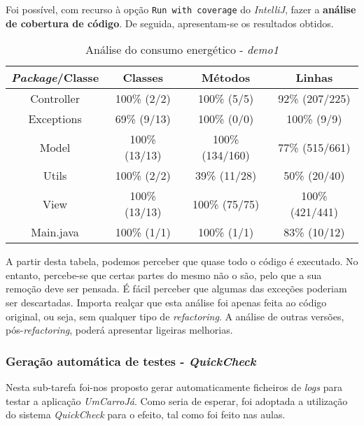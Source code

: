 \documentclass[a4paper]{report}
\begin{document}
Foi possível, com recurso à opção \texttt{Run with coverage} do \textit{IntelliJ}, fazer a \textbf{análise de cobertura de código}.
De seguida, apresentam-se os resultados obtidos.

\begin{table}[h] 
    \caption{Análise do consumo energético - \textit{demo1}}
    \begin{center}
        \begin{tabular}{ || c | c | c | c || }
        \hline
        \textbf{\textit{Package}/Classe} & \textbf{Classes} & \textbf{Métodos} & \textbf{Linhas} \\
        \hline
        \hline
        Controller & 100\% (2/2) & 100\% (5/5) & 92\% (207/225) \\
        \hline
        Exceptions & 69\% (9/13) & 100\% (0/0) & 100\% (9/9) \\
        \hline
        Model & 100\% (13/13) & 100\% (134/160) & 77\% (515/661) \\
        \hline
        Utils & 100\% (2/2) & 39\% (11/28) & 50\% (20/40) \\
        \hline
        View & 100\% (13/13) & 100\% (75/75) & 100\% (421/441) \\
        \hline
        Main.java & 100\% (1/1) & 100\% (1/1) & 83\% (10/12) \\
        \hline
        \end{tabular} 
    \end{center}
\end{table}

A partir desta tabela, podemos perceber que quase todo o código é executado. No entanto, percebe-se que certas partes do mesmo não o são, pelo que a sua remoção deve ser pensada.
É fácil perceber que algumas das exceções poderiam ser descartadas. Importa realçar que esta análise foi apenas feita ao código original, ou seja, sem qualquer tipo de \textit{refactoring}. 
A análise de outras versões, pós-\textit{refactoring}, poderá apresentar ligeiras melhorias.

\subsubsection{Geração automática de testes - \textit{QuickCheck}} \label{sssec:QuickCheckDemo1}
Nesta sub-tarefa foi-nos proposto gerar automaticamente ficheiros de \textit{logs} para testar a aplicação \textit{UmCarroJá}. Como seria de esperar, foi adoptada a utilização do sistema \textit{QuickCheck} para o efeito, tal como foi feito nas aulas.
\end{document}
